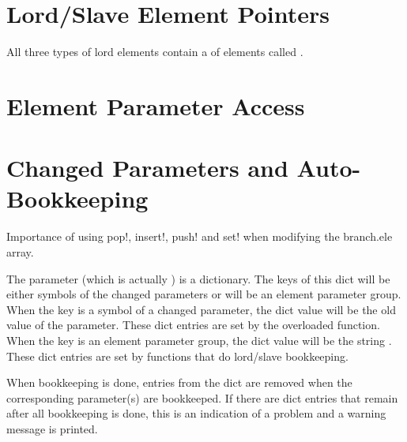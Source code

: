 \section{Lord/Slave Element Pointers}

All three types of lord elements contain a  of elements called .

\section{Element Parameter Access}
\label{s:access}

\section{Changed Parameters and Auto-Bookkeeping}
\label{s:changed.param}

Importance of using pop!, insert!, push! and set! when modifying the branch.ele array.

The  parameter (which is actually ) is a dictionary.
The keys of this dict will be either symbols of the changed parameters or
will be an element parameter group. 
When the key is a symbol of a changed parameter,
the dict value will be the old value of the parameter. These dict entries are set by the 
overloaded  function. 
When the key is an element parameter group, the dict value will be the string .
These dict entries are set by functions that do lord/slave bookkeeping.

When bookkeeping is done, entries from the  dict are removed when the corresponding
parameter(s) are bookkeeped. If there are dict entries that remain after all bookkeeping is done,
this is an indication of a problem and a warning message is printed.

